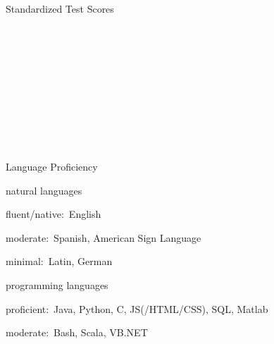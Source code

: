 \documentclass{resume}
\newcommand{\AP}[0]{\DepartmentTitle{AP Coursework}{}}
\begin{document}
\begin{rSection}{Standardized Test Scores}
        \BeginDeptEvents
        \\
        \\
        \\
        \\
        \\
        \\
        \\
        \\
        \\
        \EndDeptEvents

      \AP

        \BeginDeptEvents
        \\
        \EndDeptEvents

  \end{rSection}





  \newpage

  \begin{rSection}{Language Proficiency}

  \begin{rSubSection}{\normalfont natural languages}{}{}{}
  \item fluent/native:~English
  \item moderate:~Spanish, American Sign Language
  \item minimal:~Latin, German
  \end{rSubSection}

  \begin{rSubSection}{\normalfont programming languages}{}{}{}
  \item proficient:~Java, Python, C, JS(/HTML/CSS), SQL, Matlab
  \item moderate:~Bash, Scala, VB.NET
  \end{rSubSection}

  \end{rSection}
\end{document}
